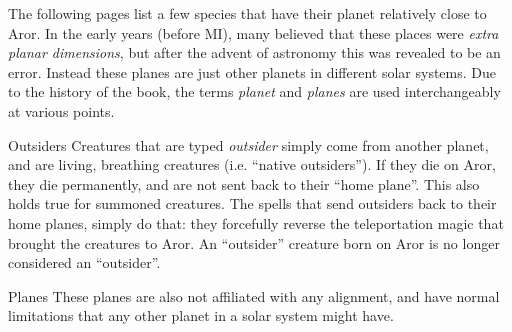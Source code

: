 The following pages list a few species that have their planet relatively close
to Aror. In the early years (before MI), many believed that these places were
\emph{extra planar dimensions}, but after the advent of astronomy this was
revealed to be an error. Instead these planes are just other planets in
different solar systems. Due to the history of the book, the terms
\emph{planet} and \emph{planes} are used interchangeably at various points.

\begin{35e}{Outsiders}
  Creatures that are typed \emph{outsider} simply come from another planet,
  and are living, breathing creatures (i.e. ``native outsiders''). If they die
  on Aror, they die permanently, and are not sent back to their ``home
  plane''. This also holds true for summoned creatures. The spells that send
  outsiders back to their home planes, simply do that: they forcefully reverse
  the teleportation magic that brought the creatures to Aror. An ``outsider''
  creature born on Aror is no longer considered an ``outsider''.
\end{35e}

\begin{35e}{Planes}
  These planes are also not affiliated with any alignment, and have normal
  limitations that any other planet in a solar system might have.
\end{35e}







